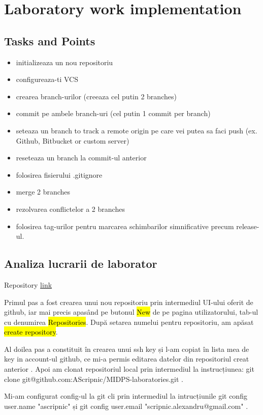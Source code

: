 \section{Laboratory work implementation}

\subsection{Tasks and Points}

\begin{itemize}
	\item initializeaza un nou repositoriu
	\item configureaza-ti VCS
	\item crearea branch-urilor (creeaza cel putin 2 branches)
	\item commit pe ambele branch-uri (cel putin 1 commit per branch)
	\item seteaza un branch to track a remote origin pe care vei putea sa faci push (ex. Github, Bitbucket or custom server)
	\item reseteaza un branch la commit-ul anterior
	\item folosirea fisierului .gitignore
	\item merge 2 branches
	\item rezolvarea conflictelor a 2 branches
	\item folosirea tag-urilor pentru marcarea schimbarilor simnificative precum release-ul.
\end{itemize}

\subsection{Analiza lucrarii de laborator}
Repository \href{https://github.com/AScripnic/MIDPS-laboratories/tree/master/Lab%231}{link}

Primul pas a fost crearea unui nou repositoriu prin intermediul UI-ului oferit de github, iar mai precis apasând pe butonul \hl{New} de pe pagina utilizatorului, tab-ul cu denumirea \hl{Repositories}. După setarea numelui pentru repositoriu, am apăsat \hl{create repository}.

Al doilea pas a constituit în crearea unui ssh key și l-am copiat în lista mea de key in account-ul github, ce mi-a permis editarea datelor din repositoriul creat anterior \cite{ssh}. Apoi am clonat repositoriul local prin intermediul la instrucțiunea: git clone git@github.com:AScripnic/MIDPS-laboratories.git .

Mi-am configurat config-ul la git cli prin intermediul la intrucțiunile git config user.name "ascripnic" și git config user.email "scripnic.alexandru@gmail.com" \cite{set-config}.

